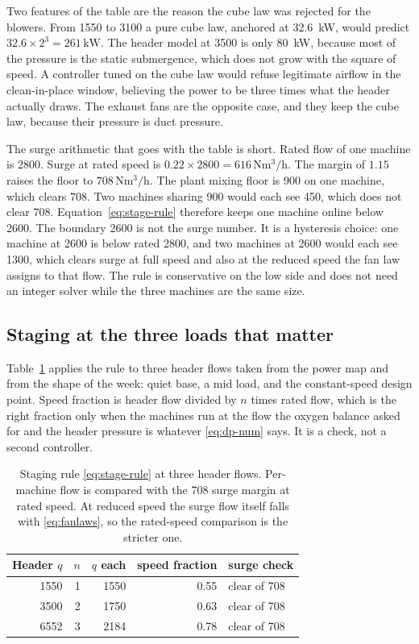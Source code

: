Two features of the table are the reason the cube law was rejected for the blowers. From \SI{1550}{\nmcph} to \SI{3100}{\nmcph} a pure cube law, anchored at \SI{32.6}{\kilo\watt}, would predict $32.6\times 2^{3}=261\,\mathrm{kW}$. The header model at \SI{3500}{\nmcph} is only \SI{80}{\kilo\watt}, because most of the pressure is the static submergence, which does not grow with the square of speed. A controller tuned on the cube law would refuse legitimate airflow in the clean-in-place window, believing the power to be three times what the header actually draws. The exhaust fans are the opposite case, and they keep the cube law, because their pressure is duct pressure.

The surge arithmetic that goes with the table is short. Rated flow of one machine is \SI{2800}{\nmcph}. Surge at rated speed is $0.22\times 2800=616\,\mathrm{Nm^{3}/h}$. The margin of $1.15$ raises the floor to $708\,\mathrm{Nm^{3}/h}$. The plant mixing floor is \SI{900}{\nmcph} on one machine, which clears $708$. Two machines sharing \SI{900}{\nmcph} would each see \SI{450}{\nmcph}, which does not clear $708$. Equation~\eqref{eq:stage-rule} therefore keeps one machine online below \SI{2600}{\nmcph}. The boundary \SI{2600}{\nmcph} is not the surge number. It is a hysteresis choice: one machine at \SI{2600}{\nmcph} is below rated \SI{2800}{\nmcph}, and two machines at \SI{2600}{\nmcph} would each see \SI{1300}{\nmcph}, which clears surge at full speed and also at the reduced speed the fan law assigns to that flow. The rule is conservative on the low side and does not need an integer solver while the three machines are the same size.

\subsection{Staging at the three loads that matter}

Table~\ref{tab:stage} applies the rule to three header flows taken from the power map and from the shape of the week: quiet base, a mid load, and the constant-speed design point. Speed fraction is header flow divided by $n$ times rated flow, which is the right fraction only when the machines run at the flow the oxygen balance asked for and the header pressure is whatever \eqref{eq:dp-num} says. It is a check, not a second controller.

\begin{table}[ht]
\centering
\caption{Staging rule \eqref{eq:stage-rule} at three header flows. Per-machine flow is compared with the \SI{708}{\nmcph} surge margin at rated speed. At reduced speed the surge flow itself falls with \eqref{eq:fanlaws}, so the rated-speed comparison is the stricter one.}
\label{tab:stage}
\small
\begin{tabular}{@{}rrrrl@{}}
\toprule
Header $q$ & $n$ & $q$ each & speed fraction & surge check \\
\midrule
1550 & 1 & 1550 & 0.55 & clear of 708 \\
3500 & 2 & 1750 & 0.63 & clear of 708 \\
6552 & 3 & 2184 & 0.78 & clear of 708 \\
\bottomrule
\end{tabular}
\end{table}

